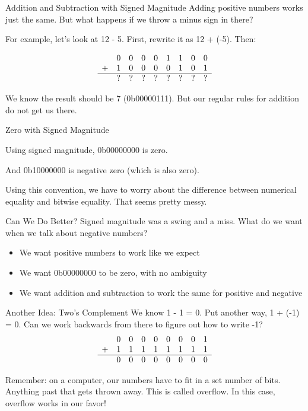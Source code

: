 \begin{frame}{Addition and Subtraction with Signed Magnitude}
    Adding positive numbers works just the same. But what happens if we throw a minus sign in there?
    
    For example, let's look at 12 - 5. First, rewrite it as 12 + (-5). Then: 

    \[
\begin{array}{ccccccccc}
      & 0 & 0 & 0 & 0 & 1 & 1 & 0 & 0 \\ 
    + & 1 & 0 & 0 & 0 & 0 & 1 & 0 & 1 \\
    \hline
      & ? & ? & ? & ? & ? & ? & ? & ? \\ 
\end{array}
\]

We know the result should be 7 (0b00000111). But our regular rules for addition do not get us there.
\end{frame}

\begin{frame}{Zero with Signed Magnitude}

Using signed magnitude, 0b00000000 is zero. 

And 0b10000000 is negative zero (which is also zero).

Using this convention, we have to worry about the difference between numerical equality and bitwise equality. That seems pretty messy.
\end{frame}

\begin{frame}{Can We Do Better?}
Signed magnitude was a swing and a miss. What do we want when we talk about negative numbers?
\begin{itemize}
    \item We want positive numbers to work like we expect
    \item We want 0b00000000 to be zero, with no ambiguity
    \item We want addition and subtraction to work the same for positive and negative
\end{itemize}
\end{frame}

\begin{frame}{Another Idea: Two's Complement}
    We know 1 - 1 = 0. Put another way, 1 + (-1) = 0. Can we work backwards from there to figure out how to write -1?
    \[
        \begin{array}{ccccccccc}
              & 0 & 0 & 0 & 0 & 0 & 0 & 0 & 1 \\
            + & 1 & 1 & 1 & 1 & 1 & 1 & 1 & 1 \\ 
            \hline
              & 0 & 0 & 0 & 0 & 0 & 0 & 0 & 0 \\ 
        \end{array}
        \]

Remember: on a computer, our numbers have to fit in a set number of bits. 
Anything past that gets thrown away. 
This is called overflow.
In this case, overflow works in our favor!
\end{frame}


